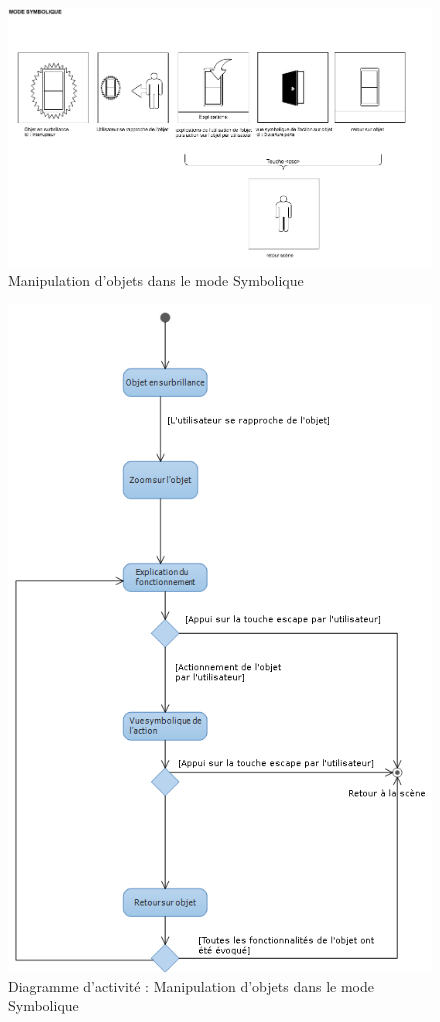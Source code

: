\begin{figure}[h]
\centering
\includegraphics[width=1\textwidth]{2-Specifications/img-utilisateur/symbolique.png}
\caption{\label{fig:MaquetteSymbolique} Manipulation d'objets dans le mode Symbolique }
\end{figure}
\begin{figure}[h]
\centering
\includegraphics[width=1\textwidth]{2-Specifications/img-utilisateur/activite-symbolique.png}
\caption{\label{fig:CasUsageSymbolique} Diagramme d'activité : Manipulation d'objets dans le mode Symbolique }
\end{figure}
\FloatBarrier 


